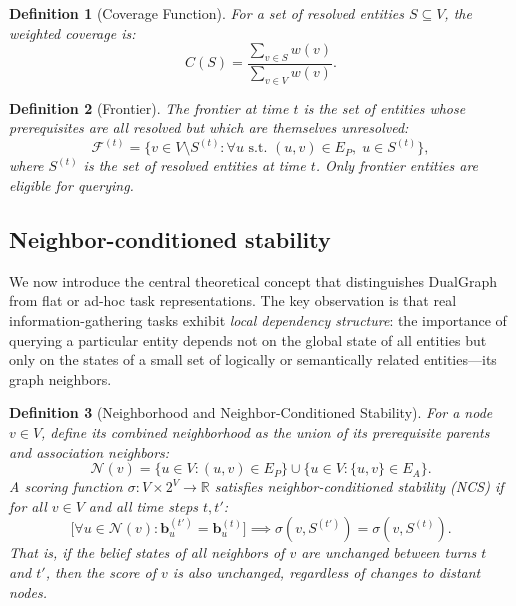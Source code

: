 \documentclass[11pt,a4paper]{article}
\newtheorem{definition}{Definition}
\begin{document}
\begin{definition}[Coverage Function]
\label{def:coverage}
For a set of resolved entities $S \subseteq V$, the weighted coverage is:
\[
  C(S) = \frac{\sum_{v \in S} w(v)}{\sum_{v \in V} w(v)}.
\]
\end{definition}

\begin{definition}[Frontier]
\label{def:frontier}
The \emph{frontier} at time $t$ is the set of entities whose prerequisites are
all resolved but which are themselves unresolved:
\[
  \mathcal{F}^{(t)} = \bigl\{v \in V \setminus S^{(t)} :
    \forall u \text{ s.t.\ } (u, v) \in E_P, \; u \in S^{(t)} \bigr\},
\]
where $S^{(t)}$ is the set of resolved entities at time $t$. Only frontier
entities are eligible for querying.
\end{definition}

\subsection{Neighbor-conditioned stability}
\label{sec:theory_ncs}

We now introduce the central theoretical concept that distinguishes
DualGraph from flat or ad-hoc task representations. The key observation
is that real information-gathering tasks exhibit \emph{local dependency
structure}: the importance of querying a particular entity depends not on
the global state of all entities but only on the states of a small set
of logically or semantically related entities---its graph neighbors.

\begin{definition}[Neighborhood and Neighbor-Conditioned Stability]
\label{def:ncs}
For a node $v \in V$, define its \emph{combined neighborhood} as the union
of its prerequisite parents and association neighbors:
\[
  \mathcal{N}(v) = \bigl\{u \in V : (u, v) \in E_P\bigr\}
    \cup \bigl\{u \in V : \{u, v\} \in E_A\bigr\}.
\]
A scoring function $\sigma: V \times 2^V \to \mathbb{R}$ satisfies
\emph{neighbor-conditioned stability} (NCS) if for all $v \in V$ and
all time steps $t, t'$:
\[
  \bigl[\forall u \in \mathcal{N}(v): \mathbf{b}_u^{(t')} =
    \mathbf{b}_u^{(t)}\bigr]
  \implies
  \sigma(v, S^{(t')}) = \sigma(v, S^{(t)}).
\]
That is, if the belief states of all neighbors of $v$ are unchanged between
turns $t$ and $t'$, then the score of $v$ is also unchanged, regardless of
changes to distant nodes.
\end{definition}
\end{document}
